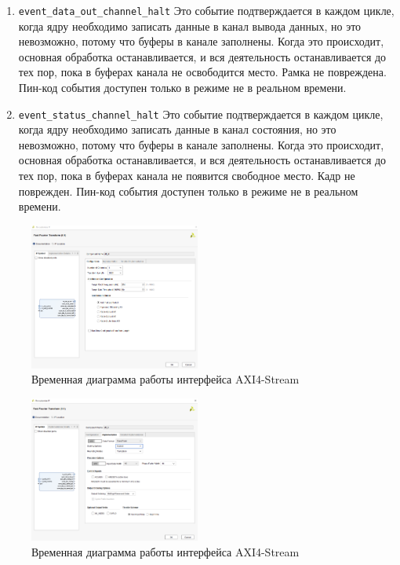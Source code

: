 \begin{enumerate}
	\item \verb|event_data_out_channel_halt|
	Это событие подтверждается в каждом цикле, когда ядру необходимо записать данные в канал вывода данных, но это невозможно, потому что буферы в канале заполнены. Когда это происходит, основная обработка останавливается, и вся деятельность останавливается до тех пор, пока в буферах канала не освободится место. Рамка не повреждена. Пин-код события доступен только в режиме не в реальном времени.
	\item \verb|event_status_channel_halt|
	Это событие подтверждается в каждом цикле, когда ядру необходимо записать данные в канал состояния, но это невозможно, потому что буферы в канале заполнены. Когда это происходит, основная обработка останавливается, и вся деятельность останавливается до тех пор, пока в буферах канала не появится свободное место. Кадр не поврежден. Пин-код события доступен только в режиме не в реальном времени.
\end{enumerate}

\begin{figure}[h]
	\centering
	\includegraphics[width=0.5\textwidth]{image/fft_config.png}
	\caption{Временная диаграмма работы интерфейса AXI4-Stream}
	\label{fft_config}
\end{figure}
	
\begin{figure}[h]
	\centering
	\includegraphics[width=0.5\textwidth]{image/fft_implemetation.png}
	\caption{Временная диаграмма работы интерфейса AXI4-Stream}
	\label{fft_implemetation}
\end{figure}
	
